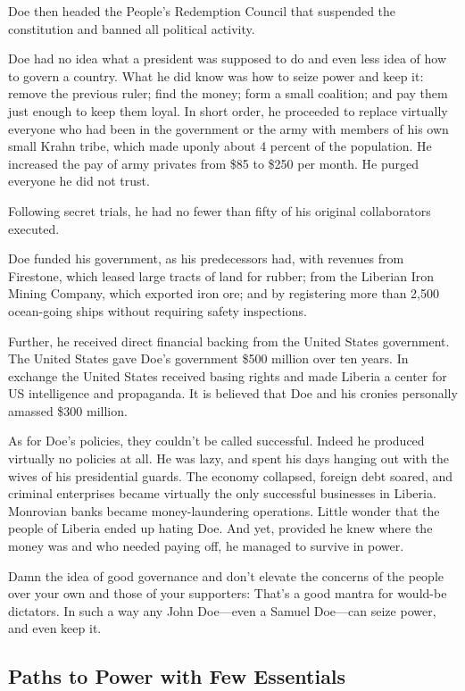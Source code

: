 \documentclass[10pt]{article}
\begin{document}
{\large Doe then headed the People's Redemption Council that suspended the
constitution and banned all political activity.}

{\large Doe had no idea what a president was supposed to do and even less idea
of how to govern a country. What he did know was how to seize power and keep it:
remove the previous ruler; find the money; form a small coalition; and pay them
just enough to keep them loyal. In short order, he proceeded to replace virtually
everyone who had been in the government or the army with members of his own small
Krahn tribe, which made uponly about 4 percent of the population. He increased
the pay of army privates from \$85 to \$250 per month. He purged everyone he did
not trust.}

{\large Following secret trials, he had no fewer than fifty of his original
collaborators executed.}

{\large Doe funded his government, as his predecessors had, with revenues from
Firestone, which leased large tracts of land for rubber; from the Liberian Iron
Mining Company, which exported iron ore; and by registering more than 2,500
ocean-going ships without requiring safety inspections.}

{\large Further, he received direct financial backing from the United States
government. The United States gave Doe's government \$500 million over ten years.
In exchange the United States received basing rights and made Liberia a center
for US intelligence and propaganda. It is believed that Doe and his cronies
personally amassed \$300 million.}

{\large As for Doe's policies, they couldn't be called successful. Indeed he
produced virtually no policies at all. He was lazy, and spent his days hanging
out with the wives of his presidential guards. The economy collapsed, foreign
debt soared, and criminal enterprises became virtually the only successful
businesses in Liberia. Monrovian banks became money-laundering operations. Little
wonder that the people of Liberia ended up hating Doe. And yet, provided he knew
where the money was and who needed paying off, he managed to survive in power.}

{\large Damn the idea of good governance and don't elevate the concerns of the
people over your own and those of your supporters: That's a good mantra for
would-be dictators. In such a way any John Doe---even a Samuel Doe---can seize
power, and even keep it.}

\subsection{Paths to Power with Few Essentials}
\end{document}
